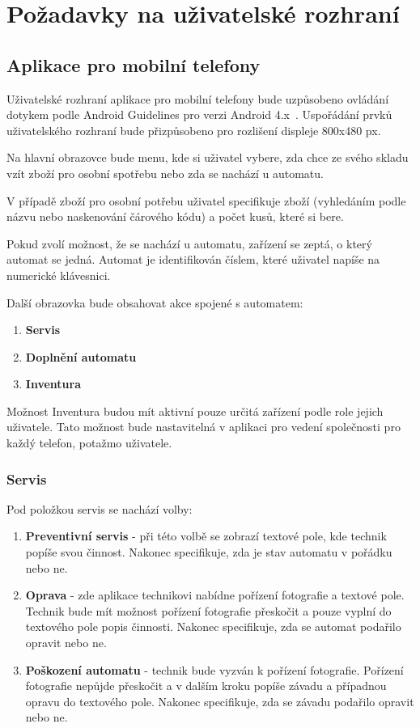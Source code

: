\documentclass[a4paper,10pt]{article}
\begin{document}
\section{Požadavky na uživatelské rozhraní}
\subsection{Aplikace pro mobilní telefony}
Uživatelské rozhraní aplikace pro mobilní telefony bude uzpůsobeno ovládání dotykem podle Android Guidelines pro verzi Android 4.x~\cite{android_guidelines}. Uspořádání prvků uživatelského rozhraní bude přizpůsobeno pro rozlišení displeje 800x480 px.

Na hlavní obrazovce bude menu, kde si uživatel vybere, zda chce ze svého skladu vzít zboží pro osobní spotřebu nebo zda se nachází u automatu.

V případě zboží pro osobní potřebu uživatel specifikuje zboží (vyhledáním podle názvu nebo naskenování čárového kódu) a počet kusů, které si bere.

Pokud zvolí možnost, že se nachází u automatu, zařízení se zeptá, o který automat se jedná. Automat je identifikován číslem, které uživatel napíše na numerické klávesnici.

Další obrazovka bude obsahovat akce spojené s automatem:

\begin{enumerate}
	\item \textbf{Servis}
	\item \textbf{Doplnění automatu}
	\item \textbf{Inventura}
\end{enumerate}

Možnost Inventura budou mít aktivní pouze určitá zařízení podle role jejich uživatele. Tato možnost bude nastavitelná v aplikaci pro vedení společnosti pro každý telefon, potažmo uživatele.

\subsubsection{Servis}
Pod položkou servis se nachází volby:
\begin{enumerate}
	\item \textbf{Preventivní servis} - při této volbě se zobrazí textové pole, kde technik popíše svou činnost. Nakonec specifikuje, zda je stav automatu v pořádku nebo ne.
	\item \textbf{Oprava} - zde aplikace technikovi nabídne pořízení fotografie a textové pole. Technik bude mít možnost pořízení fotografie přeskočit a pouze vyplní do textového pole popis činnosti. Nakonec specifikuje, zda se automat podařilo opravit nebo ne.
	\item \textbf{Poškození automatu} - technik bude vyzván k pořízení fotografie. Pořízení fotografie nepůjde přeskočit a v dalším kroku popíše závadu a případnou opravu do textového pole. Nakonec specifikuje, zda se závadu podařilo opravit nebo ne.
\end{enumerate}
\end{document}
